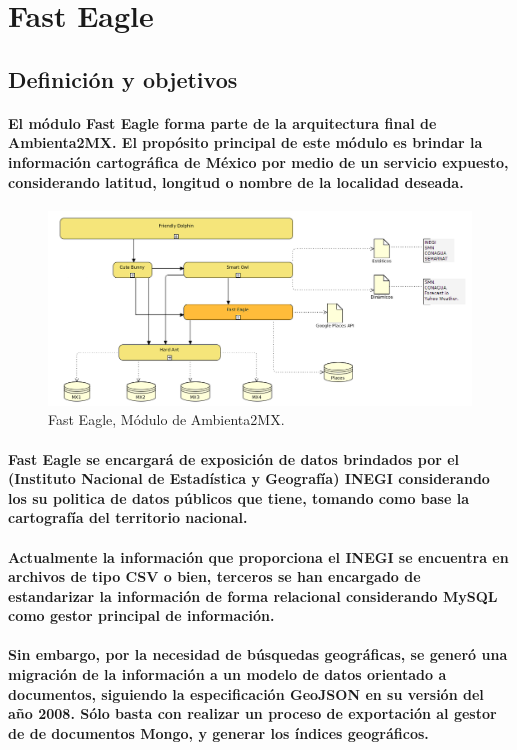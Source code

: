 \section{Fast Eagle}
  \subsection{Definición y objetivos}
    \paragraph{El módulo Fast Eagle forma parte de la arquitectura final de Ambienta2MX. El propósito principal de este módulo es brindar la información cartográfica de México por medio de un servicio expuesto, considerando latitud, longitud o nombre de la localidad deseada.}
    \begin{figure}[h!]
        \centering
          \includegraphics[width=\textwidth]{./images/DiagramaAmbienta2MX_FastEagle.png}
        \caption{Fast Eagle, Módulo de Ambienta2MX.}
    \end{figure}
    \paragraph{Fast Eagle se encargará de exposición de datos brindados por el (Instituto Nacional de Estadística y Geografía) INEGI considerando los su politica de datos públicos que tiene, tomando como base la cartografía del territorio nacional.}
    \paragraph{Actualmente la información que proporciona el INEGI se encuentra en archivos de tipo CSV o bien, terceros se han encargado de estandarizar la información de forma relacional considerando MySQL como gestor principal de información.}
    \paragraph{Sin embargo, por la necesidad de búsquedas geográficas, se generó una migración de la información a un modelo de datos orientado a documentos, siguiendo la especificación GeoJSON en su versión del año 2008. Sólo basta con realizar un proceso de exportación al gestor de de documentos Mongo, y generar los índices geográficos. \cite{35}}
